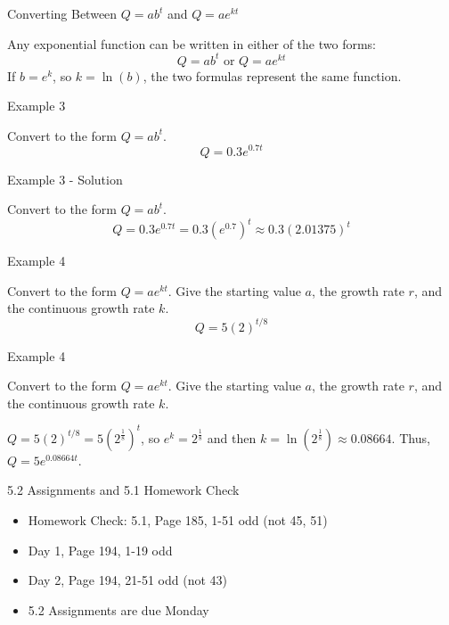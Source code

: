 \documentclass[ignorenonframetext,]{beamer}
\providecommand{\tightlist}{%
  \setlength{\itemsep}{0pt}\setlength{\parskip}{0pt}}
\begin{document}
\begin{frame}{Converting Between \(Q = ab^t\) and \(Q = ae^{kt}\)}

Any exponential function can be written in either of the two forms:
\[Q = ab^t \text{ or } Q = ae^{kt}\] If \(b = e^k\), so \(k = \ln(b)\),
the two formulas represent the same function.

\end{frame}

\begin{frame}{Example 3}

Convert to the form \(Q = ab^t\). \[Q = 0.3e^{0.7t}\]

\end{frame}

\begin{frame}{Example 3 - Solution}

Convert to the form \(Q = ab^t\).
\[Q = 0.3e^{0.7t} = 0.3(e^{0.7})^t \approx 0.3(2.01375)^t\]

\end{frame}

\begin{frame}{Example 4}

Convert to the form \(Q = ae^{kt}\). Give the starting value \(a\), the
growth rate \(r\), and the continuous growth rate \(k\).
\[Q = 5(2)^{t/8}\]

\end{frame}

\begin{frame}{Example 4}

Convert to the form \(Q = ae^{kt}\). Give the starting value \(a\), the
growth rate \(r\), and the continuous growth rate \(k\).

\(Q = 5(2)^{t/8} = 5\left(2^{\frac{1}{8}}\right)^t\), so
\(e^k = 2^{\frac{1}{8}}\) and then
\(k = \ln\left(2^{\frac{1}{8}}\right) \approx 0.08664\). Thus,
\(Q = 5e^{0.08664t}\).

\end{frame}

\begin{frame}{5.2 Assignments and 5.1 Homework Check}

\begin{itemize}
\tightlist
\item
  Homework Check: 5.1, Page 185, 1-51 odd (not 45, 51)
\item
  Day 1, Page 194, 1-19 odd
\item
  Day 2, Page 194, 21-51 odd (not 43)
\item
  5.2 Assignments are due Monday
\end{itemize}

\end{frame}
\end{document}
